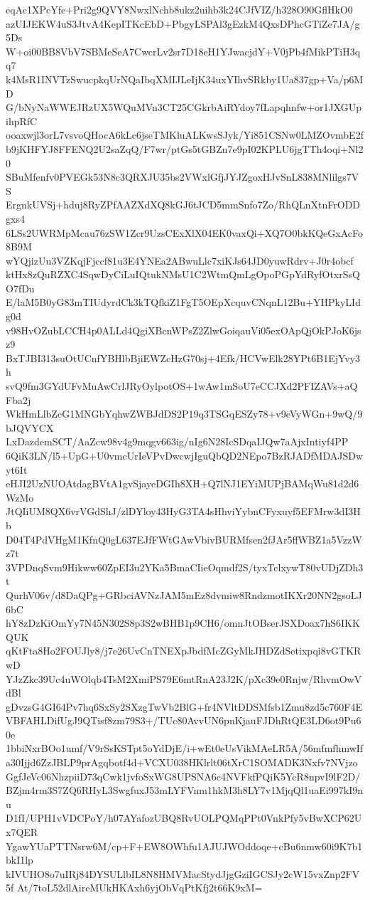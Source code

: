eqAc1XPcYfe+Pri2g9QVY8NwxlNchb8ukz2uihb3k24CJfVIZ/h328O90GflHkO0
azUIJEKW4uS3JtvA4KepITKcEbD+PbgyLSPAl3gEzkM4QxsDPhcGTiZe7JA/g5Ds
W+oi00BB8VbV7SBMeSeA7CwcrLv2sr7D18eH1YJwacjdY+V0jPb4fMikPTiH3qq7
k4MsR1INVTzSwucpkqUrNQaIbqXMIJLeIjK34uxYIhvSRkby1Ua837gp+Va/p6MD
G/bNyNaWWEJRzUX5WQuMVn3CT25CGkrbAiRYdoy7fLapqhnfw+or1JXGUpihpRfC
ooaxwjl3orL7vsvoQHocA6kLc6jseTMKluALKwsSJyk/Yi851CSNw0LMZOvmbE2f
b9jKHFYJ8FFENQ2U2saZqQ/F7wr/ptGs5tGBZn7e9pI02KPLU6jgTTh4oqi+Nl20
SBuMfenfv0PVEGk53N8c3QRXJU35bs2VWxlGfjJYJZgoxHJvSnL838MNlilgs7VS
ErgnkUVSj+hduj8RyZPfAAZXdXQ8kGJ6tJCD5mmSnfo7Zo/RhQLnXtnFrODDgxs4
6LSs2UWRMpMcau76zSW1Zcr9UzsCExXlX04EK0vaxQi+XQ7O0bkKQeGxAcFo8B9M
wYQjizUu3VZKqjFjccf81u3E4YNEa2ABwuLlc7xiKJs64JD0yuwRdrv+J0r4obcf
ktHx8zQuRZXC4SqwDyCiLuIQtukNMsU1C2WtmQmLgOpoPGpYdRyfOtxrSsQO7fDu
E/laM5B0yG83mTIUdyrdCk3kTQfkiZ1FgT5OEpXcquvCNqnL12Bu+YHPkyLIdg0d
v98HvOZubLCCH4p0ALLd4QgiXBcnWPsZ2ZlwGoiqauVi05exOApQjOkPJoK6jsz9
BxTJBI313suOtUCnfYBHlbBjiEWZcHzG70sj+4Efk/HCVwElk28YPt6B1EjYvy3h
svQ9fm3GYdUFvMuAwCrlJRyOylpotOS+1wAw1mSoU7eCCJXd2PFIZAVs+aQFba2j
WkHmLlbZcG1MNGbYqhwZWBJdDS2P19q3TSGqESZy78+v9eVyWGn+9wQ/9bJQVYCX
LxDazdemSCT/AaZcw98v4g9mqgv663ig/nIg6N28IcSDqaIJQw7aAjxIntiyf4PP
6QiK3LN/l5+UpG+U0vmcUrIeVPvDwcwjIguQbQD2NEpo7BzRJADfMDAJSDwyt6It
eHJI2UzNUOAtdagBVtA1gvSjayeDGIh8XH+Q7lNJ1EYiMUPjBAMqWu81d2d6WzMo
JtQIiUM8QX6vrVGdShJ/zlDYloy43HyG3TA4sHhviYybnCFyxuyf5EFMrw3dI3Hb
D04T4PdVHgM1KfnQ0gL637EJfFWtGAwVbivBURMfsen2fJAr5ffWBZ1a5VzzWz7t
3VPDnqSvm9Hikww60ZpEI3u2YKa5BmaCIieOqmdf2S/tyxTclxywT80vUDjZDh3t
QurhV06v/d8DaQPg+GRbciAVNzJAM5mEz8dvmiw8RndzmotIKXr20NN2gsoLJ6bC
hY8zDzKiOmYy7N45N302S8p3S2wBHB1p9CH6/omnJtOBserJSXDoax7hS6IKKQUK
qKtFta8Ho2FOUJly8/j7e26UvCnTNEXpJbdfMcZGyMkJHDZdSetixpqi8vGTKRwD
YJzZkc39Uc4uWOlqb4TsM2XmiPS79E6mtRnA23J2K/pXc39e0Rnjw/RhvmOwVdBl
gDvzsG4GI64Pv7hq6SxSy2SXzgTwVb2BlG+fr4NVltDDSMfsb1Zmu8zd5c760F4E
VBFAHLDifUgJ9QTisf8zm79S3+/TUc80AvvUN6pnKjauFJDhRtQE3LD6ot9Pu60e
1bbiNxrBOo1umf/V9rSsKSTpt5oYdDjE/i+wEt0eUsVikMAeLR5A/56mfmfhmwIf
a30Ijjd6ZzJBLP9prAgqbotf4d+VCXU038HKlrlt06tXrC1SOMADK3Nxfv7NVjzo
GgfJeVc06NhzpiiD73qCwk1jvfoSxWG8UPSNA6c4NVFkfPQiK5YcR8npvI9lF2D/
BZjm4rm3S7ZQ6RHyL3SwgfuxJ53mLYFVnm1hkM3h8LY7v1MjqQl1uaEi997kI9nu
D1fI/UPH1vVDCPoY/h07AYafozUBQ8RvUOLPQMqPPt0VnkPfy5vBwXCP62Ux7QER
YgawYUaPTTNsrw6M/cp+F+EW8OWhfu1AJUJWOddoqe+cBu6nmw60i9K7b1bkI1lp
kIVUHO8o7uIRj84DYSULlbIL8N8HMVMacStydJjgGziIGCSJy2cW15vxZnp2FV5f
At/7toL52dlAireMUkHKAxh6yjObVqPtKfj2t66K9xM=
